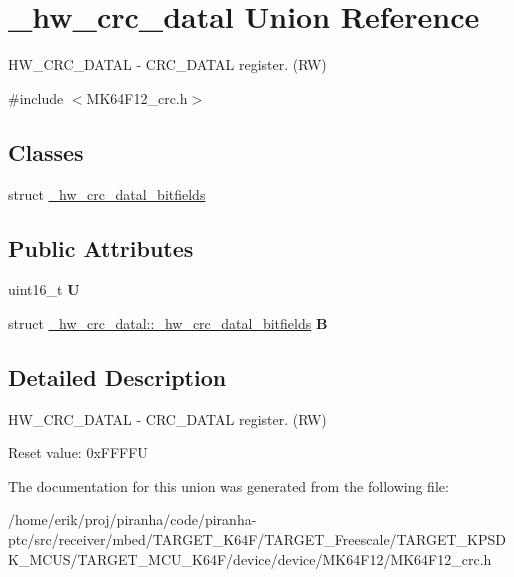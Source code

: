 \hypertarget{union__hw__crc__datal}{}\section{\+\_\+hw\+\_\+crc\+\_\+datal Union Reference}
\label{union__hw__crc__datal}


H\+W\+\_\+\+C\+R\+C\+\_\+\+D\+A\+T\+AL -\/ C\+R\+C\+\_\+\+D\+A\+T\+AL register. (RW)  




{\ttfamily \#include $<$M\+K64\+F12\+\_\+crc.\+h$>$}

\subsection*{Classes}
\begin{DoxyCompactItemize}
\item 
struct \hyperlink{struct__hw__crc__datal_1_1__hw__crc__datal__bitfields}{\+\_\+hw\+\_\+crc\+\_\+datal\+\_\+bitfields}
\end{DoxyCompactItemize}
\subsection*{Public Attributes}
\begin{DoxyCompactItemize}
\item 
uint16\+\_\+t {\bfseries U}\hypertarget{union__hw__crc__datal_a10316b39f40ae2a8a6c3b063edc27b13}{}\label{union__hw__crc__datal_a10316b39f40ae2a8a6c3b063edc27b13}

\item 
struct \hyperlink{struct__hw__crc__datal_1_1__hw__crc__datal__bitfields}{\+\_\+hw\+\_\+crc\+\_\+datal\+::\+\_\+hw\+\_\+crc\+\_\+datal\+\_\+bitfields} {\bfseries B}\hypertarget{union__hw__crc__datal_a16db0d9b920bae8ea8a91957537631f8}{}\label{union__hw__crc__datal_a16db0d9b920bae8ea8a91957537631f8}

\end{DoxyCompactItemize}


\subsection{Detailed Description}
H\+W\+\_\+\+C\+R\+C\+\_\+\+D\+A\+T\+AL -\/ C\+R\+C\+\_\+\+D\+A\+T\+AL register. (RW) 

Reset value\+: 0x\+F\+F\+F\+FU 

The documentation for this union was generated from the following file\+:\begin{DoxyCompactItemize}
\item 
/home/erik/proj/piranha/code/piranha-\/ptc/src/receiver/mbed/\+T\+A\+R\+G\+E\+T\+\_\+\+K64\+F/\+T\+A\+R\+G\+E\+T\+\_\+\+Freescale/\+T\+A\+R\+G\+E\+T\+\_\+\+K\+P\+S\+D\+K\+\_\+\+M\+C\+U\+S/\+T\+A\+R\+G\+E\+T\+\_\+\+M\+C\+U\+\_\+\+K64\+F/device/device/\+M\+K64\+F12/M\+K64\+F12\+\_\+crc.\+h\end{DoxyCompactItemize}
